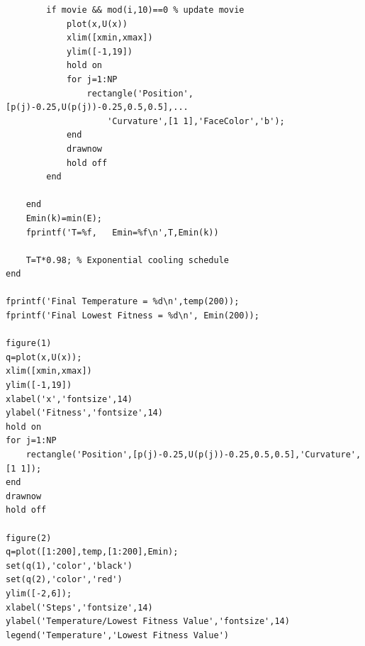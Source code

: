 \begin{verbatim}
        if movie && mod(i,10)==0 % update movie
            plot(x,U(x))
            xlim([xmin,xmax])
            ylim([-1,19])
            hold on
            for j=1:NP
                rectangle('Position',[p(j)-0.25,U(p(j))-0.25,0.5,0.5],...
                    'Curvature',[1 1],'FaceColor','b');
            end
            drawnow
            hold off
        end

    end
    Emin(k)=min(E);
    fprintf('T=%f,   Emin=%f\n',T,Emin(k))
    
    T=T*0.98; % Exponential cooling schedule
end

fprintf('Final Temperature = %d\n',temp(200));
fprintf('Final Lowest Fitness = %d\n', Emin(200));
    
figure(1)
q=plot(x,U(x));
xlim([xmin,xmax])
ylim([-1,19])
xlabel('x','fontsize',14)
ylabel('Fitness','fontsize',14)
hold on
for j=1:NP
	rectangle('Position',[p(j)-0.25,U(p(j))-0.25,0.5,0.5],'Curvature',[1 1]);
end
drawnow
hold off

figure(2)
q=plot([1:200],temp,[1:200],Emin);
set(q(1),'color','black')
set(q(2),'color','red')
ylim([-2,6]);
xlabel('Steps','fontsize',14)
ylabel('Temperature/Lowest Fitness Value','fontsize',14)
legend('Temperature','Lowest Fitness Value')
\end{verbatim}
\normalsize



